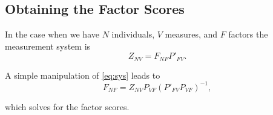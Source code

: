 \subsection{Obtaining the Factor Scores} \label{sec:scores}
In the case when we have $N$ individuals, $V$ measures, and $F$ factors the measurement system is
\begin{equation}
Z_{NV} = F_{NF} P'_{FV}. \label{eq:sys}
\end{equation}

\noindent A simple manipulation of \eqref{eq:sys} leads to
\begin{equation}
F_{NF} = Z_{NV} P_{VF} \left( P'_{FV} P_{VF} \right)^{-1}, 
\end{equation}

\noindent which solves for the factor scores.